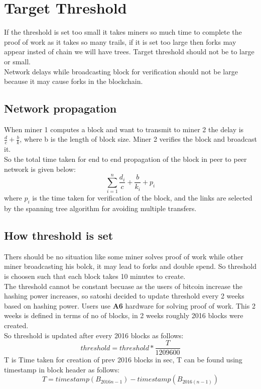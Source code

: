 \documentclass{article}
\begin{document}
\section{Target Threshold}
If the threshold is set too small it takes miners so much time to complete the proof of work as it takes so many trails, if it is set too large then forks may appear insted of chain we will have trees. Target threshold should not be to large or small.  \\
Network delays while broadcasting block for verification should not be large because it may cause forks in the blockchain.
\subsection{Network propagation}
\begin{center}
\end{center}
When miner 1 computes a block and want to transmit to miner 2 the delay is $\frac{d}{c}+\frac{b}{k}$, where b is the length of block size. Miner 2 verifies the block and broadcast it. \\
So the total time taken for end to end propagation of the block in peer to peer network is given below:
$$\sum_{i=1}^{n}\frac{d_i}{c}+\frac{b}{k_i}+p_i$$
where $p_i$ is the time taken for verification of the block, and the links are selected by the spanning tree algorithm for avoiding multiple transfers.
\subsection{How threshold is set}
Thers should be no situation like some miner solves proof of work while other miner broadcasting his bolck, it may lead to forks and double spend. So threshold is choosen such that each block takes 10 minutes to create. \\
The threshold cannot be constant becuase as the users of bitcoin increase the hashing power increases, so satoshi decided to update threshold every 2 weeks based on hashing power. Users use \textbf{A6} hardware for solving proof of work. This 2 weeks is defined in terms of no of blocks, in 2 weeks roughly 2016 blocks were created. \\
So threshold is updated after every 2016 blocks as follows:
$$threshold = threshold * \frac{T}{1209600}$$
T is Time taken for creation of prev 2016 blocks in sec, T can be found using timestamp in block header as follows:
$$T = timestamp(B_{2016n-1}) - timestamp(B_{2016(n-1)})$$
\end{document}
